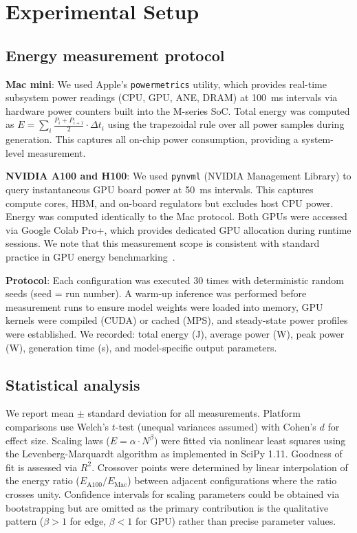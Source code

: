 \documentclass[preprint,12pt]{elsarticle}
\begin{document}
\section{Experimental Setup}
\label{sec:experimental}

\subsection{Energy measurement protocol}

\textbf{Mac mini}: We used Apple's \texttt{powermetrics} utility, which provides real-time subsystem power readings (CPU, GPU, ANE, DRAM) at 100~ms intervals via hardware power counters built into the M-series SoC. Total energy was computed as $E = \sum_{i} \frac{P_i + P_{i+1}}{2} \cdot \Delta t_i$ using the trapezoidal rule over all power samples during generation. This captures all on-chip power consumption, providing a system-level measurement.

\textbf{NVIDIA A100 and H100}: We used \texttt{pynvml} (NVIDIA Management Library) to query instantaneous GPU board power at 50~ms intervals. This captures compute cores, HBM, and on-board regulators but excludes host CPU power. Energy was computed identically to the Mac protocol. Both GPUs were accessed via Google Colab Pro+, which provides dedicated GPU allocation during runtime sessions. We note that this measurement scope is consistent with standard practice in GPU energy benchmarking~\cite{you2023zeus,samsi2023words,luccioni2024power}.

\textbf{Protocol}: Each configuration was executed 30 times with deterministic random seeds (seed = run number). A warm-up inference was performed before measurement runs to ensure model weights were loaded into memory, GPU kernels were compiled (CUDA) or cached (MPS), and steady-state power profiles were established. We recorded: total energy (J), average power (W), peak power (W), generation time (s), and model-specific output parameters.

\subsection{Statistical analysis}

We report mean $\pm$ standard deviation for all measurements. Platform comparisons use Welch's $t$-test (unequal variances assumed) with Cohen's $d$ for effect size. Scaling laws ($E = \alpha \cdot N^\beta$) were fitted via nonlinear least squares using the Levenberg-Marquardt algorithm as implemented in SciPy 1.11. Goodness of fit is assessed via $R^2$. Crossover points were determined by linear interpolation of the energy ratio ($E_\text{A100}/E_\text{Mac}$) between adjacent configurations where the ratio crosses unity. Confidence intervals for scaling parameters could be obtained via bootstrapping but are omitted as the primary contribution is the qualitative pattern ($\beta > 1$ for edge, $\beta < 1$ for GPU) rather than precise parameter values.
\end{document}
